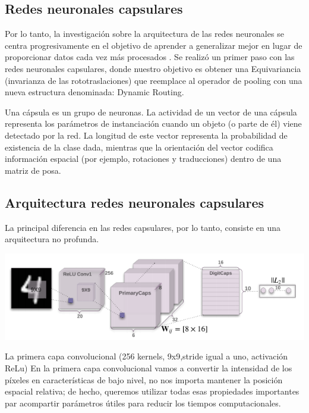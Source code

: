 \documentclass[12pt, donotrepeattitle, jou]{apa6}
\begin{document}
    \subsection{Redes neuronales capsulares}
    Por lo tanto, la investigación sobre la arquitectura de las redes neuronales se centra progresivamente en el objetivo de aprender a generalizar mejor en lugar de proporcionar datos cada vez más procesados \parencite{Capsules3}. Se realizó un primer paso con las redes neuronales capsulares, donde nuestro objetivo es obtener una Equivariancia (invarianza de las rototraslaciones) que reemplace al operador de pooling con una nueva estructura denominada: Dynamic Routing.
    
    Una cápsula es un grupo de neuronas. La actividad de un vector de una cápsula representa los parámetros de instanciación cuando un objeto (o parte de él) viene detectado por la red. La longitud de este vector representa la probabilidad de existencia de la clase dada, mientras que la orientación del vector codifica información espacial (por ejemplo, rotaciones y traducciones) dentro de una matriz de posa.
    
    \subsection{Arquitectura redes neuronales capsulares}
    La principal diferencia en las redes capsulares, por lo tanto, consiste en una arquitectura no profunda.
    
    \begin{center}
        \begin{minipage}{0.6\linewidth}
            \includegraphics[width=\linewidth]{images/capsules}
        \end{minipage}
    \end{center}

    La primera capa convolucional (256 kernels, 9x9,stride igual a uno, activación ReLu)
    En la primera capa convolucional vamos a convertir la intensidad de los píxeles en características de bajo nivel, no nos importa mantener la posición espacial relativa; de hecho, queremos utilizar todas esas propiedades importantes par acompartir parámetros útiles para reducir los tiempos computacionales.
\end{document}
